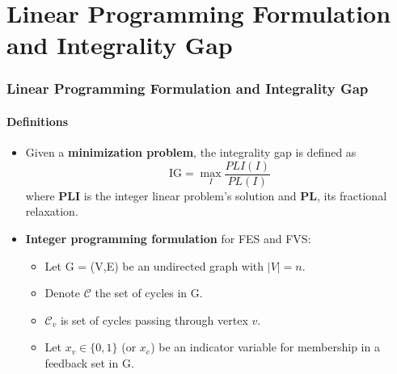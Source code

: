 \documentclass[10pt]{beamer}
\begin{document}
\section{Linear Programming Formulation and Integrality Gap}
\begin{frame}
\frametitle{Linear Programming Formulation and Integrality Gap}
\framesubtitle{Definitions}
\begin{itemize}
    \item Given a \textbf{minimization problem}, the integrality gap is defined as 
    \begin{equation*} 
        \text{IG} = \max_{I} \frac{PLI(I)}{PL(I)}
    \end{equation*}
    where \textbf{PLI} is the integer linear problem's solution and \textbf{PL}, its fractional relaxation.
    
    \item \textbf{Integer programming formulation} for FES and FVS:
    \begin{itemize}
        \item Let G = (V,E) be an undirected graph with \(|V| = n\). 
        \item Denote \(\mathcal{C}\) the set of cycles in G.
        \item \(\mathcal{C}_v\) is set of cycles passing through vertex \(v\).
        \item Let \(x_v \in \{0, 1\}\)  (or \(x_e\)) be an indicator variable for membership in a feedback set in G.
    \end{itemize}
\end{itemize}
\end{frame}
\end{document}
